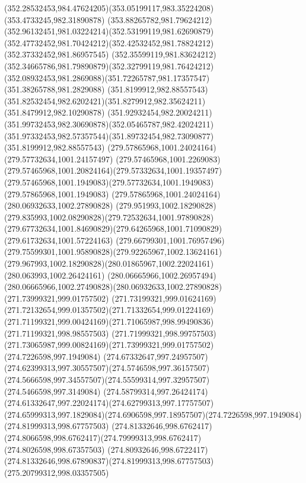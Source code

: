 {    \curveto(352.28532453,984.47624205)(353.05199117,983.35224208)(353.4733245,982.31890878)
    \curveto(353.88265782,981.79624212)(352.96132451,981.03224214)(352.53199119,981.62690879)
    \curveto(352.47732452,981.70424212)(352.42532452,981.78824212)(352.37332452,981.86957545)
    \curveto(352.35599119,981.83624212)(352.34665786,981.79890879)(352.32799119,981.76424212)
    \curveto(352.08932453,981.2869088)(351.72265787,981.17357547)(351.38265788,981.2829088)
    \moveto(351.8199912,982.88557543)
    \curveto(351.82532454,982.6202421)(351.8279912,982.35624211)(351.8479912,982.10290878)
    \curveto(351.92932454,982.20024211)(351.99732453,982.30690878)(352.05465787,982.42024211)
    \curveto(351.97332453,982.57357544)(351.89732454,982.73090877)(351.8199912,982.88557543)
    \moveto(279.57865968,1001.24024164)
    \lineto(279.57732634,1001.24157497)
    \curveto(279.57465968,1001.2269083)(279.57465968,1001.20824164)(279.57332634,1001.19357497)
    \curveto(279.57465968,1001.1949083)(279.57732634,1001.1949083)(279.57865968,1001.1949083)
    \lineto(279.57865968,1001.24024164)
    \moveto(280.06932633,1002.27890828)
    \curveto(279.951993,1002.18290828)(279.835993,1002.08290828)(279.72532634,1001.97890828)
    \curveto(279.67732634,1001.84690829)(279.64265968,1001.71090829)(279.61732634,1001.57224163)
    \curveto(279.66799301,1001.76957496)(279.75599301,1001.95890828)(279.92265967,1002.13624161)
    \curveto(279.967993,1002.18290828)(280.01865967,1002.22024161)(280.063993,1002.26424161)
    \curveto(280.06665966,1002.26957494)(280.06665966,1002.27490828)(280.06932633,1002.27890828)
    \moveto(271.73999321,999.01757502)
    \curveto(271.73199321,999.01624169)(271.72132654,999.01357502)(271.71332654,999.01224169)
    \curveto(271.71199321,999.00424169)(271.71065987,998.99490836)(271.71199321,998.98557503)
    \curveto(271.71999321,998.99757503)(271.73065987,999.00824169)(271.73999321,999.01757502)
    \moveto(274.7226598,997.1949084)
    \curveto(274.67332647,997.24957507)(274.62399313,997.30557507)(274.5746598,997.36157507)
    \curveto(274.5666598,997.34557507)(274.55599314,997.32957507)(274.5466598,997.3149084)
    \curveto(274.58799314,997.26424174)(274.61332647,997.22024174)(274.62799313,997.17757507)
    \curveto(274.65999313,997.1829084)(274.6906598,997.18957507)(274.7226598,997.1949084)
    \moveto(274.81999313,998.67757503)
    \curveto(274.81332646,998.6762417)(274.8066598,998.6762417)(274.79999313,998.6762417)
    \lineto(274.8026598,998.67357503)
    \curveto(274.80932646,998.6722417)(274.81332646,998.67890837)(274.81999313,998.67757503)
    \moveto(275.20799312,998.03357505)
}
